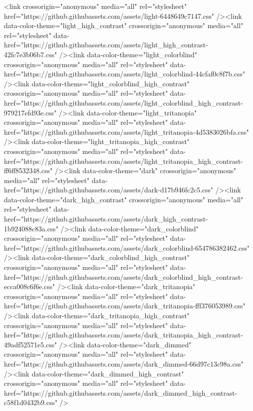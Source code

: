   <link crossorigin="anonymous" media="all" rel="stylesheet" href="https://github.githubassets.com/assets/light-6448649c7147.css" /><link data-color-theme="light_high_contrast" crossorigin="anonymous" media="all" rel="stylesheet" data-href="https://github.githubassets.com/assets/light_high_contrast-42fc7e3b06b7.css" /><link data-color-theme="light_colorblind" crossorigin="anonymous" media="all" rel="stylesheet" data-href="https://github.githubassets.com/assets/light_colorblind-44cfaf0c8f7b.css" /><link data-color-theme="light_colorblind_high_contrast" crossorigin="anonymous" media="all" rel="stylesheet" data-href="https://github.githubassets.com/assets/light_colorblind_high_contrast-979217efd93e.css" /><link data-color-theme="light_tritanopia" crossorigin="anonymous" media="all" rel="stylesheet" data-href="https://github.githubassets.com/assets/light_tritanopia-4d5383026bfa.css" /><link data-color-theme="light_tritanopia_high_contrast" crossorigin="anonymous" media="all" rel="stylesheet" data-href="https://github.githubassets.com/assets/light_tritanopia_high_contrast-ff6ff8532348.css" /><link data-color-theme="dark" crossorigin="anonymous" media="all" rel="stylesheet" data-href="https://github.githubassets.com/assets/dark-d17b946fc2c5.css" /><link data-color-theme="dark_high_contrast" crossorigin="anonymous" media="all" rel="stylesheet" data-href="https://github.githubassets.com/assets/dark_high_contrast-1b924088c83a.css" /><link data-color-theme="dark_colorblind" crossorigin="anonymous" media="all" rel="stylesheet" data-href="https://github.githubassets.com/assets/dark_colorblind-654786382462.css" /><link data-color-theme="dark_colorblind_high_contrast" crossorigin="anonymous" media="all" rel="stylesheet" data-href="https://github.githubassets.com/assets/dark_colorblind_high_contrast-ecca008c6f6e.css" /><link data-color-theme="dark_tritanopia" crossorigin="anonymous" media="all" rel="stylesheet" data-href="https://github.githubassets.com/assets/dark_tritanopia-fff376053989.css" /><link data-color-theme="dark_tritanopia_high_contrast" crossorigin="anonymous" media="all" rel="stylesheet" data-href="https://github.githubassets.com/assets/dark_tritanopia_high_contrast-49adf52571e5.css" /><link data-color-theme="dark_dimmed" crossorigin="anonymous" media="all" rel="stylesheet" data-href="https://github.githubassets.com/assets/dark_dimmed-66d97c13c98a.css" /><link data-color-theme="dark_dimmed_high_contrast" crossorigin="anonymous" media="all" rel="stylesheet" data-href="https://github.githubassets.com/assets/dark_dimmed_high_contrast-c58f1d0432b9.css" />

